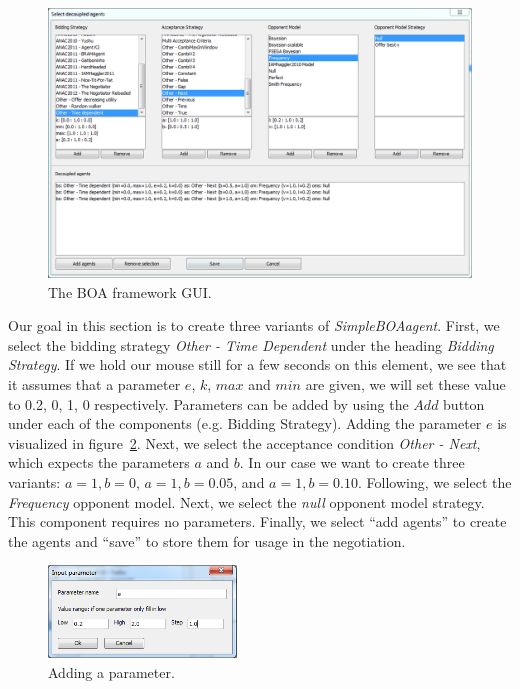 \documentclass[]{article}
\begin{document}
\begin{figure}[h!]
	\center
	\includegraphics[width=15cm]{media/Decoupled_DecoupledGUI.png}
	\caption{The BOA framework GUI.}
	\label{fig:decoupledGUI}
\end{figure}

Our goal in this section is to create three variants of \textit{SimpleBOAagent}. First, we select the bidding strategy \textit{Other - Time Dependent} under the heading \textit{Bidding Strategy}.  If we hold our mouse still for a few seconds on this element, we see that it assumes that a parameter $e$, $k$, $max$ and $min$ are given, we will set these value to 0.2, 0, 1, 0 respectively. Parameters can be added by using the $Add$ button under each of the components (e.g. Bidding Strategy). Adding the parameter $e$ is visualized in figure~\ref{fig:decoupledparam}. Next, we select the acceptance condition \textit{Other - Next}, which expects the parameters $a$ and $b$. In our case we want to create three variants: $a=1, b=0$, $a=1, b=0.05$, and $a=1, b=0.10$. Following, we select the \textit{Frequency} opponent model. Next, we select the \textit{null} opponent model strategy. This component requires no parameters. Finally, we select ``add agents'' to create the agents and ``save'' to store them for usage in the negotiation.

\begin{figure}[h!] 
	\center
	\includegraphics[width=5cm]{media/Decoupled_Param.png}
	\caption{Adding a parameter.}
	\label{fig:decoupledparam}
\end{figure}
\end{document}

